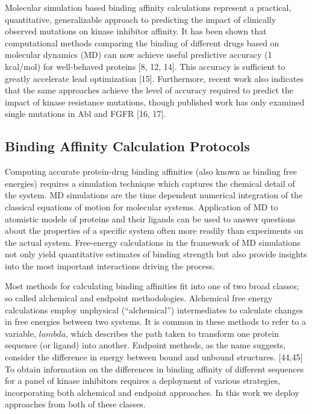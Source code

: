 \documentclass[conference]{IEEEtran}
\begin{document}
Molecular simulation based binding affinity calculations represent a practical, quantitative, generalizable approach to predicting the impact of clinically observed mutations on kinase inhibitor affinity. It has been shown that computational methods comparing the binding of different drugs based on molecular dynamics (MD) can now achieve useful predictive accuracy (1 kcal/mol) for well-behaved proteins [8, 12, 14]. This accuracy is sufficient to greatly accelerate lead optimization [15]. Furthermore, recent work also indicates that the same approaches achieve the level of accuracy required to predict the impact of kinase resistance mutations, though published work has only examined single mutations in Abl and FGFR [16, 17].

\subsection{Binding Affinity Calculation Protocols}\label{sec:bac}

Computing accurate protein-drug binding affinities (also known as binding free energies) requires a simulation technique which captures the chemical detail of the system. MD simulations are the time dependent numerical integration of the classical equations of motion for molecular systems. Application of MD to atomistic models of proteins and their ligands can be used to answer questions about the properties of a specific system often more readily than experiments on the actual system. Free-energy calculations in the framework of MD simulations not only yield quantitative estimates of binding strength but also provide insights into the most important interactions driving the process.

Most methods for calculating binding affinities fit into one of two broad classes; so called alchemical and endpoint methodologies. Alchemical free energy calculations employ unphysical (“alchemical”) intermediates to calculate changes in free energies between two systems. It is common in these methods to refer to a variable, $lambda$, which describes the path taken to transform one protein sequence (or ligand) into another. Endpoint methods, as the name suggests, consider the difference in energy between bound and unbound structures. [44,45] To obtain information on the differences in binding affinity of different sequences for a panel of kinase inhibitors requires a deployment of various strategies, incorporating both alchemical and endpoint approaches. In this work we deploy approaches from both of these classes.
\end{document}
